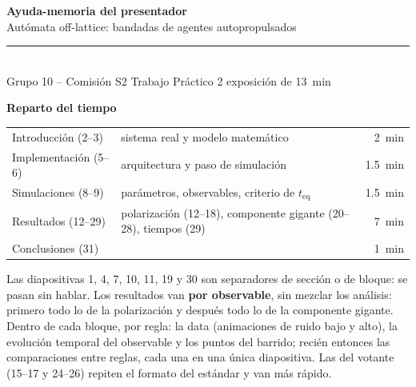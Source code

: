 \documentclass[10pt,a4paper]{article}
\newcommand{\teq}{\ensuremath{t_{\mathrm{eq}}}}
\begin{document}
\begin{center}
    {\LARGE\bfseries\color{azul} Ayuda-memoria del presentador}\\[0.3em]
    {\large\color{gris} Autómata off-lattice: bandadas de agentes autopropulsados}\\[0.5em]
    \textcolor{azul!30}{\rule{0.4\textwidth}{1pt}}\\[0.5em]
    {\small Grupo 10 -- Comisión S2 \enspace\textbar\enspace Trabajo Práctico 2
     \enspace\textbar\enspace exposición de \SI{13}{min}}
\end{center}
\vspace{0.4em}

\begin{tcolorbox}[colback=grisclaro,colframe=azul!40,boxrule=0.5pt,
                  arc=2pt,left=6pt,right=6pt,top=4pt,bottom=4pt]
{\small\bfseries\color{azul} Reparto del tiempo}\par\vspace{0.3em}
{\small
\begin{tabular}{@{}llr@{}}
    Introducción (2--3)      & sistema real y modelo matemático        & \SI{2}{min}\\
    Implementación (5--6)    & arquitectura y paso de simulación       & \SI{1.5}{min}\\
    Simulaciones (8--9)      & parámetros, observables, criterio de \teq & \SI{1.5}{min}\\
    Resultados (12--29)      & polarización (12--18), componente gigante (20--28), tiempos (29) & \SI{7}{min}\\
    Conclusiones (31)        &                                          & \SI{1}{min}\\
\end{tabular}}
\par\vspace{0.4em}
{\small Las diapositivas \num{1}, \num{4}, \num{7}, \num{10}, \num{11},
\num{19} y \num{30} son separadores de sección o de bloque: se pasan sin
hablar. Los resultados van \textbf{por observable}, sin mezclar los análisis:
primero todo lo de la polarización y después todo lo de la componente gigante.
Dentro de cada bloque, por regla: la data (animaciones de ruido bajo y alto),
la evolución temporal del observable y los puntos del barrido; recién entonces
las comparaciones entre reglas, cada una en una única diapositiva. Las del
votante (15--17 y 24--26) repiten el formato del estándar y van más rápido.}
\end{tcolorbox}
\end{document}
